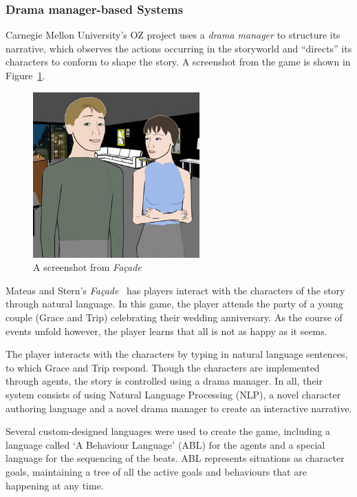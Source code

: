 \documentclass[11pt]{report}
\begin{document}
\subsubsection{Drama manager-based Systems}
\label{sec:drama-systems}

Carnegie Mellon University's OZ project \citep{mateas1999oz} uses a \emph{drama
  manager} to structure its narrative, which observes the actions occurring in
the storyworld and ``directs'' its characters to conform to shape the story. A
screenshot from the game is shown in Figure~\ref{fig:facade-screen}.

\begin{figure}[!t]
\centerline{\includegraphics[height=2.5in]{facade.jpg}}
\caption{A screenshot from \emph{Fa\c{c}ade} \citep{mateas2003faccade}}\label{fig:facade-screen}
\end{figure}

Mateas and Stern's \emph{Fa\c{c}ade}~\citep{mateas2003faccade} has players interact with the characters of the story through natural language. In this game, the player attends the party of a young couple (Grace and Trip) celebrating their wedding anniversary. As the course of events unfold however, the player learns that all is not as happy as it seems.

The player interacts with the characters by typing in natural language
sentences, to which Grace and Trip respond. Though the characters are
implemented through agents, the story is controlled using a drama manager. In
all, their system consists of using Natural Language Processing (NLP), a novel character authoring language and a novel drama manager to create an interactive narrative.

Several custom-designed languages were used to create the game, including a language called `A Behaviour Language' (ABL) for the agents and a special language for the sequencing of the beats. ABL represents situations as character goals, maintaining a tree of all the active goals and behaviours that are happening at any time.
\end{document}
